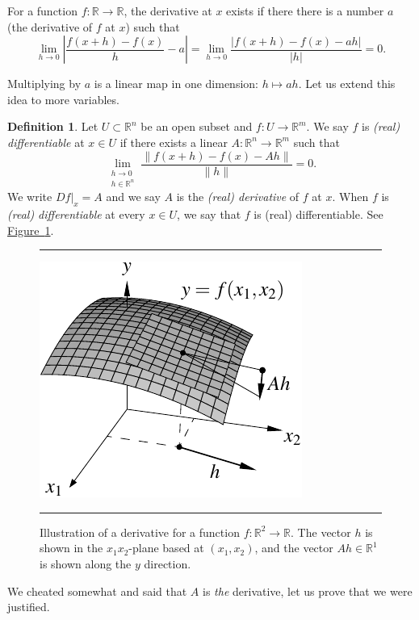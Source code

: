 \documentclass[12pt,openany]{book}
\newcommand{\sabs}[1]{\lvert {#1} \rvert}
\newcommand{\snorm}[1]{\lVert {#1} \rVert}
\newcommand{\abs}[1]{\left\lvert {#1} \right\rvert}
\newcommand{\R}{{\mathbb{R}}}
\theoremstyle{plain}
\theoremstyle{remark}
\theoremstyle{definition}
\newtheorem{defn}[thm]{Definition}
\newenvironment{myfig}{%
\begin{figure}[h!t]
\noindent\rule{\textwidth}{0.4pt}\vspace{12pt}\par\centering}%
{\par\noindent\rule{\textwidth}{0.4pt}
\end{figure}}
\theoremstyle{exercise}
\theoremstyle{example}
\newcommand{\figureref}[1]{\hyperref[#1]{Figure~\ref*{#1}}}
\begin{document}
For a function $f \colon \R \to \R$, 
the derivative at $x$ exists if there
there is a number $a$ (the derivative of $f$ at $x$) such that
\begin{equation*}
\lim_{h \to 0} \abs{\frac{f(x+h)-f(x)}{h} - a} =
\lim_{h \to 0} \frac{\sabs{f(x+h)-f(x) - ah}}{\sabs{h}}
= 0.
\end{equation*}

Multiplying by $a$ is a linear map in one dimension:
$h \mapsto ah$.  Let us extend this idea to more variables.

\begin{defn}
Let $U \subset \R^n$ be an open subset and $f \colon U \to \R^m$.  We
say $f$ is \emph{(real) differentiable}
at $x \in U$ if there exists
a linear $A \colon \R^n \to \R^m$ such that
\begin{equation*}
\lim_{\substack{h \to 0\\h\in \R^n}}
\frac{\snorm{f(x+h)-f(x) - Ah}}{\snorm{h}} = 0 .
\end{equation*}
We write $Df|_x = A$ and
we say $A$ is the \emph{(real) derivative} of $f$ at $x$.
When $f$ is \emph{(real) differentiable} at
every $x \in U$, we say that $f$ is (real) differentiable.  See
\figureref{fig:svder}.
\end{defn}

\begin{myfig}
\includegraphics{figures/svder}
\caption{Illustration of a derivative for a function $f \colon \R^2 \to \R$.  The vector $h$ is shown
in the $x_1x_2$-plane based at $(x_1,x_2)$, and the vector
$Ah \in \R^1$ is shown along the $y$ direction.\label{fig:svder}}
\end{myfig}

We cheated somewhat and said that $A$
is \emph{the} derivative, let us prove that we were justified.
\end{document}
